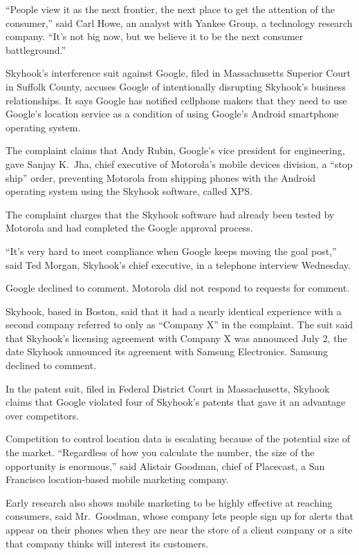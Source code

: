 ﻿\documentclass[12pt]{article}
\begin{document}
``People view it as the next frontier, the next place to get the attention of the consumer,'' said
Carl Howe, an analyst with Yankee Group, a technology research company. ``It's not big now, but we
believe it to be the next consumer battleground.''

Skyhook's interference suit against Google, filed in Massachusetts Superior Court in Suffolk County,
accuses Google of intentionally disrupting Skyhook's business relationships. It says Google has
notified cellphone makers that they need to use Google's location service as a condition of using
Google's Android smartphone operating system.

The complaint claims that Andy Rubin, Google's vice president for engineering, gave Sanjay K.~Jha,
chief executive of Motorola's mobile devices division, a ``stop ship'' order, preventing Motorola
from shipping phones with the Android operating system using the Skyhook software, called XPS.

The complaint charges that the Skyhook software had already been tested by Motorola and had
completed the Google approval process.

``It's very hard to meet compliance when Google keeps moving the goal post,'' said Ted Morgan,
Skyhook's chief executive, in a telephone interview Wednesday.

Google declined to comment. Motorola did not respond to requests for comment.

Skyhook, based in Boston, said that it had a nearly identical experience with a second company
referred to only as ``Company X'' in the complaint. The suit said that Skyhook's licensing agreement
with Company X was announced July 2, the date Skyhook announced its agreement with Samsung
Electronics. Samsung declined to comment.

In the patent suit, filed in Federal District Court in Massachusetts, Skyhook claims that Google
violated four of Skyhook's patents that gave it an advantage over competitors.

Competition to control location data is escalating because of the potential size of the market.
``Regardless of how you calculate the number, the size of the opportunity is enormous,'' said
Alistair Goodman, chief of Placecast, a San Francisco location-based mobile marketing company.

Early research also shows mobile marketing to be highly effective at reaching consumers, said
Mr.~Goodman, whose company lets people sign up for alerts that appear on their phones when they are
near the store of a client company or a site that company thinks will interest its customers.
\end{document}
